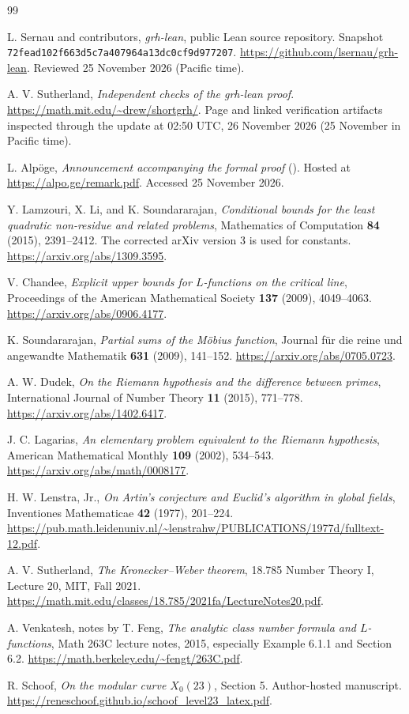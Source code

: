 \clearpage
{}
{}
\begin{thebibliography}{99}
\raggedright

L. Sernau and contributors,
\emph{grh-lean}, public Lean source repository.
Snapshot \nolinkurl{72fead102f663d5c7a407964a13dc0cf9d977207}.
\url{https://github.com/lsernau/grh-lean}.
Reviewed 25 November 2026 (Pacific time).

A. V. Sutherland,
\emph{Independent checks of the grh-lean proof}.
\url{https://math.mit.edu/~drew/shortgrh/}.
Page and linked verification artifacts inspected through the update at
02:50 UTC, 26 November 2026 (25 November in Pacific time).

L. Alp\"oge,
\emph{Announcement accompanying the formal proof} ().
Hosted at
\url{https://alpo.ge/remark.pdf}.
Accessed 25 November 2026.

Y. Lamzouri, X. Li, and K. Soundararajan,
\emph{Conditional bounds for the least quadratic non-residue and related problems},
Mathematics of Computation \textbf{84} (2015), 2391--2412.
The corrected arXiv version 3 is used for constants.
\url{https://arxiv.org/abs/1309.3595}.

V. Chandee,
\emph{Explicit upper bounds for \(L\)-functions on the critical line},
Proceedings of the American Mathematical Society \textbf{137} (2009), 4049--4063.
\url{https://arxiv.org/abs/0906.4177}.

K. Soundararajan,
\emph{Partial sums of the M\"obius function},
Journal f\"ur die reine und angewandte Mathematik \textbf{631} (2009), 141--152.
\url{https://arxiv.org/abs/0705.0723}.

A. W. Dudek,
\emph{On the Riemann hypothesis and the difference between primes},
International Journal of Number Theory \textbf{11} (2015), 771--778.
\url{https://arxiv.org/abs/1402.6417}.

J. C. Lagarias,
\emph{An elementary problem equivalent to the Riemann hypothesis},
American Mathematical Monthly \textbf{109} (2002), 534--543.
\url{https://arxiv.org/abs/math/0008177}.

H. W. Lenstra, Jr.,
\emph{On Artin's conjecture and Euclid's algorithm in global fields},
Inventiones Mathematicae \textbf{42} (1977), 201--224.
\url{https://pub.math.leidenuniv.nl/~lenstrahw/PUBLICATIONS/1977d/fulltext-12.pdf}.

A. V. Sutherland,
\emph{The Kronecker--Weber theorem},
18.785 Number Theory I, Lecture 20, MIT, Fall 2021.
\url{https://math.mit.edu/classes/18.785/2021fa/LectureNotes20.pdf}.

A. Venkatesh, notes by T. Feng,
\emph{The analytic class number formula and \(L\)-functions},
Math 263C lecture notes, 2015, especially Example 6.1.1 and Section 6.2.
\url{https://math.berkeley.edu/~fengt/263C.pdf}.

R. Schoof,
\emph{On the modular curve \(X_0(23)\)}, Section 5.
Author-hosted manuscript.
\url{https://reneschoof.github.io/schoof_level23_latex.pdf}.

\end{thebibliography}
